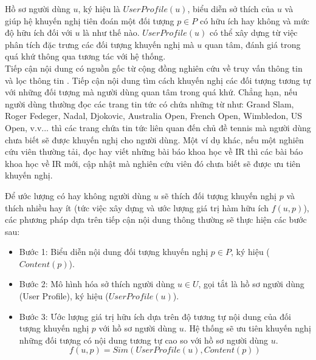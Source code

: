 Hồ sơ người dùng $u$, ký hiệu là $UserProfile(u)$, biểu diễn sở thích của $u$ và giúp hệ khuyến nghị tiên đoán một đối tượng $p \in P$ có hữu ích hay không và mức độ hữu ích đối với $u$ là như thế nào. $UserProfile(u)$ có thể xây dựng từ việc phân tích đặc trưng các đối tượng khuyến nghị mà $u$ quan tâm, đánh giá trong quá khứ thông qua tương tác với hệ thống. \\

Tiếp cận nội dung có nguồn gốc từ cộng đồng nghiên cứu về truy vấn thông tin và lọc thông tin \cite{Belkin:1992, Balabanovic:1997:FCC}. Tiếp cận nội dung tìm cách khuyến nghị các đối tượng tương tự với những đối tượng mà người dùng quan tâm trong quá khứ. Chẳng hạn, nếu người dùng thường đọc các trang tin tức có chứa những từ như: Grand Slam, Roger Fedeger, Nadal, Djokovic, Australia Open, French Open, Wimbledon, US Open, v.v...  thì các trang chứa tin tức liên quan đến chủ đề tennis mà người dùng chưa biết sẽ được khuyến nghị cho người dùng. Một ví dụ khác, nếu một nghiên cứu viên thường tải, đọc hay viết những bài báo khoa học về IR thì các bài báo khoa học về IR mới, cập nhật mà nghiên cứu viên đó chưa biết sẽ được ưu tiên khuyến nghị.

Để ước lượng có hay không người dùng $u$ sẽ thích đối tượng khuyến nghị $p$ và thích nhiều hay ít (tức việc xây dựng và ước lượng giá trị hàm hữu ích $f(u,p)$), các phương pháp dựa trên tiếp cận nội dung thông thường sẽ thực hiện các bước sau:
\begin{itemize}
	\item Bước 1: Biểu diễn nội dung đối tượng khuyến nghị $p \in P$, ký hiệu ($Content(p)$).
	\item Bước 2: Mô hình hóa sở thích người dùng $u \in U$, gọi tắt là hồ sơ người dùng (User Profile), ký hiệu ($UserProfile(u)$). 
	\item Bước 3: Ước lượng giá trị hữu ích dựa trên độ tương tự nội dung của đối tượng khuyến nghị $p$ với hồ sơ người dùng $u$. Hệ thống sẽ ưu tiên khuyến nghị những đối tượng có nội dung tương tự cao so với hồ sơ người dùng $u$.
	\begin{equation}
	f(u,p) = Sim(UserProfile(u), Content(p))
	\end{equation}
\end{itemize}


